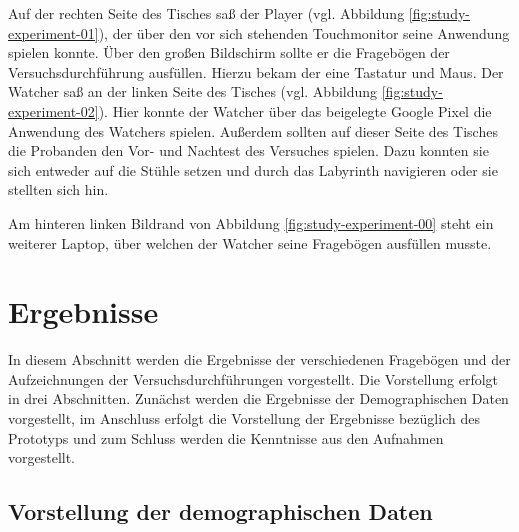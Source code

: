 Auf der rechten Seite des Tisches saß der Player (vgl. Abbildung \ref{fig:study-experiment-01}), der über den vor sich stehenden Touchmonitor seine Anwendung spielen konnte. Über den großen Bildschirm sollte er die Fragebögen der Versuchsdurchführung ausfüllen. Hierzu bekam der eine Tastatur und Maus. Der Watcher saß an der linken Seite des Tisches (vgl. Abbildung \ref{fig:study-experiment-02}). Hier konnte der Watcher über das beigelegte Google Pixel die Anwendung des Watchers spielen. Außerdem sollten auf dieser Seite des Tisches die Probanden den Vor- und Nachtest des Versuches spielen. Dazu konnten sie sich entweder auf die Stühle setzen und durch das Labyrinth navigieren oder sie stellten sich hin.

Am hinteren linken Bildrand von Abbildung \ref{fig:study-experiment-00} steht ein weiterer Laptop, über welchen der Watcher seine Fragebögen ausfüllen musste.

\section{Ergebnisse}
In diesem Abschnitt werden die Ergebnisse der verschiedenen Fragebögen und der Aufzeichnungen der Versuchsdurchführungen vorgestellt.
Die Vorstellung erfolgt in drei Abschnitten. Zunächst werden die Ergebnisse der Demographischen Daten vorgestellt, im Anschluss erfolgt die Vorstellung der Ergebnisse bezüglich des Prototyps und zum Schluss werden die Kenntnisse aus den Aufnahmen vorgestellt.

\subsection{Vorstellung der demographischen Daten}





